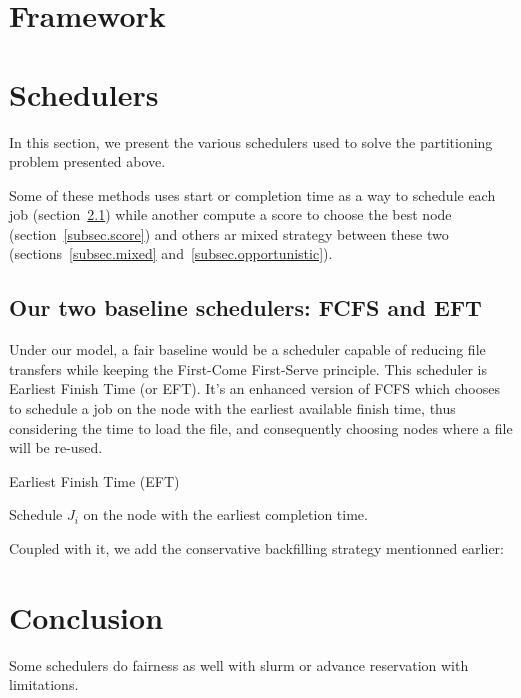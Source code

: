 \documentclass[conference,10pt]{IEEEtran}
\begin{document}

\section{Framework}\label{sec.framework}

\section{Schedulers}\label{sec.schedulers}

In this section, we present the various schedulers used to solve
the partitioning problem presented above. 

Some of these methods uses start or completion time as a way to
schedule each job (section~\ref{subsec.fcfs_eft}) while another compute 
a score to choose the best node (section~\ref{subsec.score}) and others
ar mixed strategy between these two (sections~\ref{subsec.mixed} and~\ref{subsec.opportunistic}).

\subsection{Our two baseline schedulers: FCFS and EFT}\label{subsec.fcfs_eft}

Under our model, a fair baseline would be a scheduler capable
of reducing file transfers while keeping the First-Come First-Serve 
principle. This scheduler is Earliest Finish Time (or EFT).
It's an enhanced version of FCFS which chooses to schedule a job
on the node with the earliest available finish time, thus considering
the time to load the file, and consequently choosing nodes where a file will
be re-used. 

\begin{algorithm}[htbp]
	\caption{Earliest Finish Time (EFT)}\label{algo.eft}
	\begin{algorithmic}[1]
			\State Schedule $J_i$ on the node with the earliest completion time.
		\EndFor
	\end{algorithmic}
\end{algorithm}

Coupled with it, we add the conservative backfilling strategy mentionned earlier:

\section{Conclusion}\label{sec.conclusion}

Some schedulers do fairness as well with slurm or advance reservation with limitations.

\end{document}
